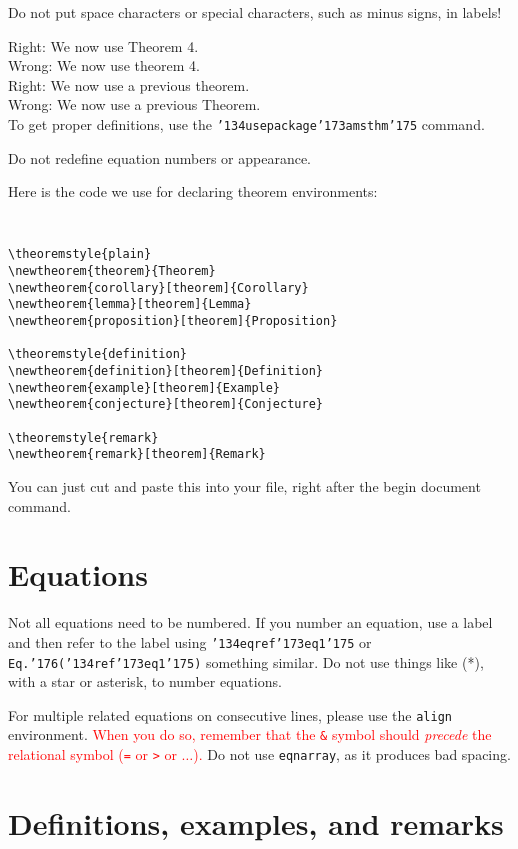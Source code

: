 \documentclass[12pt]{article}
\begin{document}
Do not put space characters or special characters, such as minus signs,
in labels!

\noindent  Right:  We now use Theorem 4.\\
\noindent Wrong:  We now use theorem 4.\\
\noindent Right:  We now use a previous theorem.\\
\noindent Wrong:  We now use a previous Theorem.\\

To get proper definitions, use the
{\tt \char'134usepackage\char'173amsthm\char'175} command.

Do not redefine equation numbers or appearance.  

Here is the code we use for declaring theorem environments:

{\tt
\begin{verbatim}
\theoremstyle{plain}
\newtheorem{theorem}{Theorem}
\newtheorem{corollary}[theorem]{Corollary}
\newtheorem{lemma}[theorem]{Lemma}
\newtheorem{proposition}[theorem]{Proposition}

\theoremstyle{definition}
\newtheorem{definition}[theorem]{Definition}
\newtheorem{example}[theorem]{Example}
\newtheorem{conjecture}[theorem]{Conjecture}

\theoremstyle{remark}
\newtheorem{remark}[theorem]{Remark}
\end{verbatim}
}

You can just cut and paste this into your file, right after the begin
document command.

\section{Equations}

Not all equations need to be numbered.  If you number an equation,
use a label and then refer to the label using
{\tt \char'134eqref\char'173eq1\char'175} or
{\tt Eq.\char'176(\char'134ref\char'173eq1\char'175)}
something similar.  Do not use things like (*), with a
star or asterisk, to number equations.

For multiple related equations on consecutive lines,
please use the {\tt align} environment.  \textcolor{red}{When you do so, remember
that the {\tt \&} symbol should {\it precede\/} the relational symbol
({\tt =} or {\tt >} or $\ldots$).}
Do not use {\tt eqnarray}, as it produces bad spacing.

\section{Definitions, examples, and remarks}
\end{document}
